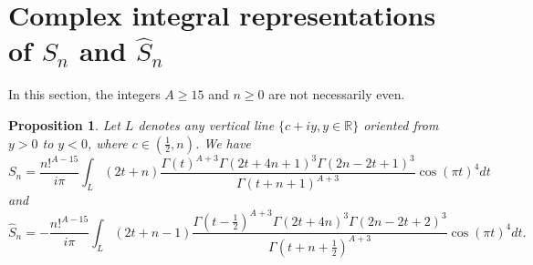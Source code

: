 \documentclass[reqno,12pt]{article}
\newtheorem{prop}{Proposition}
\theoremstyle{remark}
\begin{document}
\section{Complex integral representations of $S_n$ and $\widehat S_n$} \label{sec:3}
In this section, the integers $A\ge 15$ and $n\ge 0$ are not necessarily even.

\begin{prop}\label{prop:2} Let $L$ denotes any vertical line $\{c+iy, y\in \mathbb R\}$ oriented from $y>0$ to $y<0$, where $c\in (\frac12,n)$. We have
\begin{equation}\label{eq:1}
S_n=\frac{n!^{A-15}}{i\pi}\int_L (2t+n)\frac{\Gamma(t)^{A+3}\Gamma(2t+4n+1)^3\Gamma(2n-2t+1)^3}{\Gamma(t+n+1)^{A+3}}\cos(\pi t)^4dt
\end{equation}
and
\begin{equation}\label{eq:2}
\widehat{S}_n=-\frac{n!^{A-15}}{i\pi}\int_L (2t+n-1)\frac{\Gamma(t-\frac{1}{2})^{A+3}\Gamma(2t+4n)^3\Gamma(2n-2t+2)^3}{\Gamma(t+n+\frac12)^{A+3}}\cos(\pi t)^4dt.
\end{equation}
\end{prop}
\end{document}
